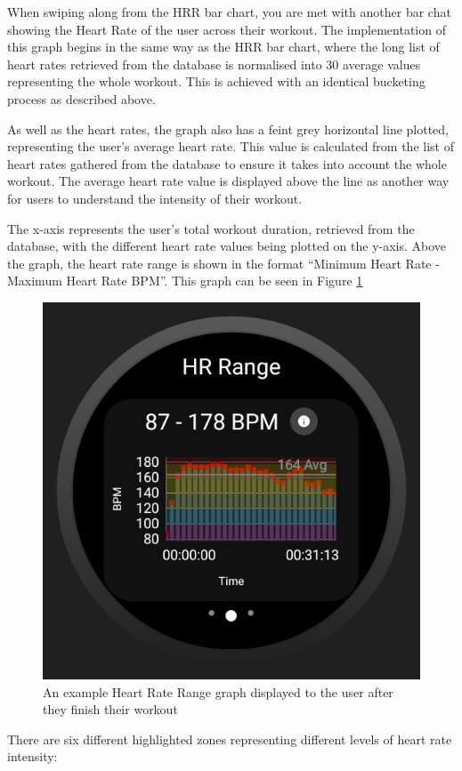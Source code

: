 \documentclass{l4proj}
\begin{document}
When swiping along from the HRR bar chart, you are met with another bar chat showing the Heart Rate of the user across their workout. The implementation of this graph begins in the same way as the HRR bar chart, where the long list of heart rates retrieved from the database is normalised into 30 average values representing the whole workout. This is achieved with an identical bucketing process as described above.

As well as the heart rates, the graph also has a feint grey horizontal line plotted, representing the user’s average heart rate. This value is calculated from the list of heart rates gathered from the database to ensure it takes into account the whole workout. The average heart rate value is displayed above the line as another way for users to understand the intensity of their workout.

The x-axis represents the user’s total workout duration, retrieved from the database, with the different heart rate values being plotted on the y-axis. Above the graph, the heart rate range is shown in the format “{Minimum Heart Rate} - {Maximum Heart Rate} BPM”. This graph can be seen in Figure \ref{fig:heartrategraph}

\begin{figure}[h!]
    \centering
    \includegraphics[width=0.4\linewidth]{dissertation//dissImages/HRRangeGraph.png}
    \caption{An example Heart Rate Range graph displayed to the user after they finish their workout}
    \label{fig:heartrategraph}
\end{figure}

There are six different highlighted zones representing different levels of heart rate intensity:
\end{document}
